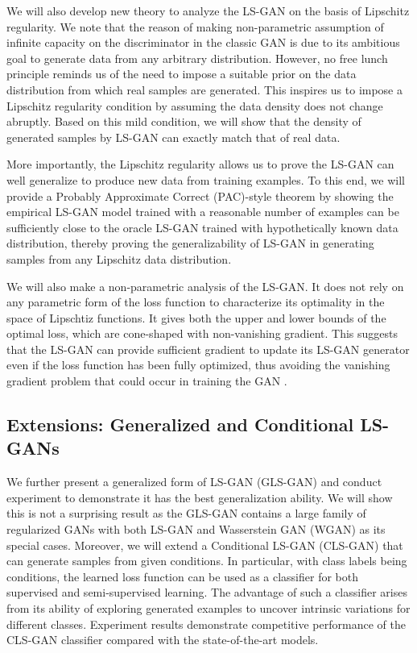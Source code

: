 \documentclass[11pt,fullpage, letterpaper,twoside]{article}
\newcommand{\1}[1]{\mathds{1}_{\left[#1\right]}}
\begin{document}
We will also develop new theory to analyze the LS-GAN on the basis of Lipschitz regularity.  We note that the reason of making non-parametric assumption of infinite capacity on the discriminator in the classic GAN is due to its ambitious goal to generate data from any arbitrary distribution.  However,
no free lunch \cite{wolpert1996lack} principle reminds us of the need to impose a suitable prior on the data distribution from which real samples are generated.  This inspires us to impose a
Lipschitz regularity condition by assuming the data density does not change abruptly.
Based on this mild condition, we will show that the density of generated samples by LS-GAN can exactly match that of real data.

More importantly, the Lipschitz regularity allows us to prove the LS-GAN can well generalize to produce new data from training examples.
To this end, we will provide a Probably Approximate Correct (PAC)-style theorem by showing the empirical LS-GAN model trained with a reasonable number of examples can be sufficiently close to the oracle LS-GAN trained with hypothetically known data distribution, thereby proving the generalizability of LS-GAN in generating samples from any Lipschitz data distribution.

We will also make a non-parametric analysis of the LS-GAN. It does not rely on any parametric form of the loss function to characterize its optimality in the space of Lipschtiz functions. It gives both the upper and lower bounds of the optimal loss, which are cone-shaped with non-vanishing gradient. This suggests that the LS-GAN can provide sufficient gradient to update its LS-GAN generator even if the loss function has been fully optimized, thus avoiding the vanishing gradient problem that could occur in training the GAN \cite{arjovsky2017towards}.


\subsection{Extensions: Generalized and Conditional LS-GANs}

We further present a generalized form of LS-GAN (GLS-GAN) and conduct experiment to demonstrate it has the best generalization ability. We will show this is not a surprising result as the GLS-GAN contains a large family of regularized GANs with both LS-GAN and Wasserstein GAN (WGAN) \cite{wgan17} as its special cases.
Moreover, we will extend a Conditional LS-GAN (CLS-GAN) that can generate samples from given conditions.  In particular, with class labels being conditions, the learned loss function can be used as a classifier for both supervised and semi-supervised learning.  The advantage of such a classifier arises from its ability of exploring generated examples to uncover intrinsic variations for different classes. Experiment results demonstrate competitive performance of the CLS-GAN classifier compared with the state-of-the-art models.
\end{document}
